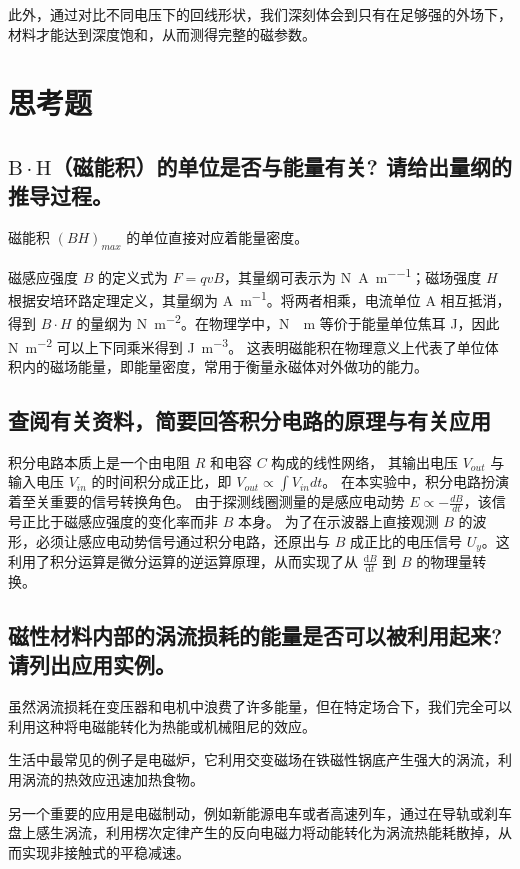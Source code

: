 \documentclass{../template/Report}%
\begin{document}
\begin{fullreportonly}
    此外，通过对比不同电压下的回线形状，我们深刻体会到只有在足够强的外场下，材料才能达到深度饱和，从而测得完整的磁参数。

    \section{思考题}

    \subsection{\texorpdfstring{$\mathrm{B} \cdot \mathrm{H}$}{B·H}（磁能积）的单位是否与能量有关? 请给出量纲的推导过程。}
    磁能积 $(BH)_{max}$ 的单位直接对应着能量密度。

    磁感应强度 $B$ 的定义式为 $F = qvB$，其量纲可表示为 \unit{\newton\per\ampere\per\meter}；磁场强度 $H$ 根据安培环路定理定义，其量纲为 \unit{\ampere\per\meter}。将两者相乘，电流单位 \unit{\ampere} 相互抵消，得到 $B \cdot H$ 的量纲为 \unit{\newton\per\meter\squared}。在物理学中，\unit{\newton\cdot\meter} 等价于能量单位焦耳 \unit{\joule}，因此 \unit{\newton\per\meter\squared} 可以上下同乘米得到 \unit{\joule\per\meter\cubed}。
    这表明磁能积在物理意义上代表了单位体积内的磁场能量，即能量密度，常用于衡量永磁体对外做功的能力。

    \subsection{查阅有关资料，简要回答积分电路的原理与有关应用}
    积分电路本质上是一个由电阻 $R$ 和电容 $C$ 构成的线性网络，
    其输出电压 $V_{out}$ 与输入电压 $V_{in}$ 的时间积分成正比，即 $V_{out} \propto \int V_{in} dt$。
    在本实验中，积分电路扮演着至关重要的信号转换角色。
    由于探测线圈测量的是感应电动势 $E \propto -\frac{dB}{dt}$，该信号正比于磁感应强度的变化率而非 $B$ 本身。
    为了在示波器上直接观测 $B$ 的波形，必须让感应电动势信号通过积分电路，还原出与 $B$ 成正比的电压信号 $U_y$。这利用了积分运算是微分运算的逆运算原理，从而实现了从 $\frac{\mathrm{d}B}{\mathrm{d}t}$ 到 $B$ 的物理量转换。

    \subsection{磁性材料内部的涡流损耗的能量是否可以被利用起来?请列出应用实例。}
    虽然涡流损耗在变压器和电机中浪费了许多能量，但在特定场合下，我们完全可以利用这种将电磁能转化为热能或机械阻尼的效应。

    生活中最常见的例子是电磁炉，它利用交变磁场在铁磁性锅底产生强大的涡流，利用涡流的热效应迅速加热食物。

    另一个重要的应用是电磁制动，例如新能源电车或者高速列车，通过在导轨或刹车盘上感生涡流，利用楞次定律产生的反向电磁力将动能转化为涡流热能耗散掉，从而实现非接触式的平稳减速。
\end{fullreportonly}
\insertnotes
\end{document}
